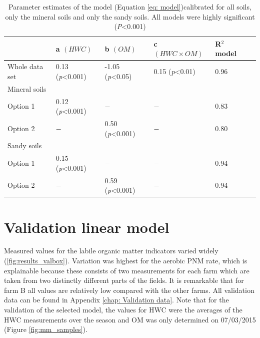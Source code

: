 \documentclass[10pt,twoside,dutch,english]{report}
\begin{document}
\begin{table}[h] %
	\caption{Parameter estimates of the model (Equation \ref{eq: model})calibrated for all soils, only the mineral soils and only the sandy soils. All models were highly significant (\textit{P}<0.001)}
	\footnotesize 
	\renewcommand{\arraystretch}{1.2}
	
	
	\begin{tabu} to %
		\toprule	\rowfont{\bfseries}
        & a \quad $(HWC)$	&b \quad $(OM)$ &c $(HWC\times OM)$  & R$^{2}$ model\\ \midrule
     Whole data set &0.13 (\textit{p}<0.001)&-1.05 (\textit{p}<0.05)&0.15 (\textit{p}<0.01)&0.96\\
     Mineral soils &&&&&\\
     \quad Option 1&0.12 (\textit{p}<0.001)&$-$&$-$&0.83\\
     \quad Option 2&$-$&0.50 (\textit{p}<0.001)&$-$&0.80\\
     Sandy soils&&&&\\
     \quad Option 1&0.15 (\textit{p}<0.001)&$-$&$-$&0.94\\
     \quad Option 2&$-$&0.59 (\textit{p}<0.001)&$-$&0.94\\
        \bottomrule
	\end{tabu}
		\label{tab:parameters}
\end{table}






\section{Validation linear model}
Measured values for the labile organic matter indicators varied widely (\ref{fig:results_valbox}). Variation was highest for the aerobic PNM rate, which is explainable because these consists of two measurements for each farm which are taken from two distinctly different parts of the fields. It is remarkable that for farm B all values are relatively low compared with the other farms. All validation data can be found in Appendix \ref{chap: Validation data}.
Note that for the validation of the selected model, the values for HWC were the averages of the HWC measurements over the season and OM was only determined on 07/03/2015 (Figure \ref{fig:mm_samples}).
%
% 
%
\end{document}

